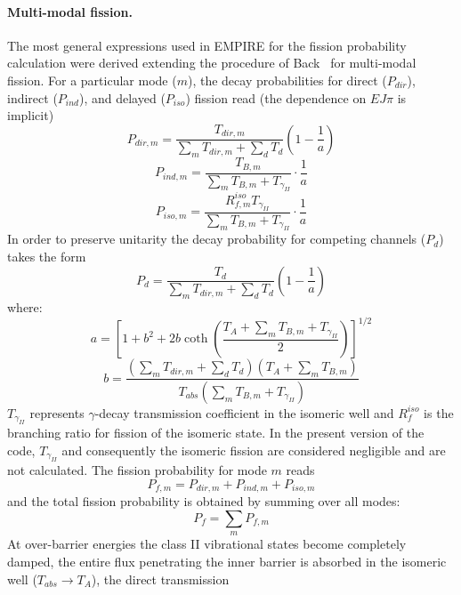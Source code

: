 \documentclass[twocolumn,amsmath,amssymb,10pt,groupedaddress,letter]{revtex4}
\begin{document}
\paragraph*{Multi-modal fission.}
The most general expressions used in EMPIRE for the fission probability
calculation were derived extending the procedure of Back~\cite{Back:74}
for multi-modal fission. For a particular mode ($m$), the decay probabilities
for direct ($P_{dir}$), indirect ($P_{ind}$), and delayed ($P_{iso}$)
fission read (the dependence on $EJ\pi$ is implicit)
\begin{equation}
P_{dir,m}=\frac{T_{dir,m}}{\sum_{m}T_{dir,m}+\sum_{d}T_{d}}\left(1-\frac{1}{a}\right)
\end{equation}
\begin{equation}
P_{ind,m}=\frac{T_{B,m}}{\sum_{m}T_{B,m}+T_{\gamma_{II}}}\cdot\frac{1}{a}
\end{equation}
\begin{equation}
P_{iso,m}=\frac{R_{f,m}^{iso}T_{\gamma_{II}}}{\sum_{m}T_{B,m}+T_{\gamma_{II}}}\cdot\frac{1}{a}
\end{equation}
 In order to preserve unitarity the decay probability for competing
channels ($P_{d}$) takes the form
\begin{equation}
P_{d}=\frac{T_{d}}{\sum_{m}T_{dir,m}+\sum_{d}T_{d}}\left(1-\frac{1}{a}\right)
\end{equation}
\noindent where: \[
a=\left[1+b^{2}+2b\coth\left(\frac{T_{A}+\sum_{m}T_{B,m}+T_{\gamma_{II}}}{2}\right)\right]^{1/2}\]
 \[
b=\frac{(\sum_{m}T_{dir,m}+\sum_{d}T_{d})(T_{A}+\sum_{m}T_{B,m})}{T_{abs}(\sum_{m}T_{B,m}+T_{\gamma_{II}})}\]
 $T_{\gamma_{II}}$ represents $\gamma$-decay transmission coefficient
in the isomeric well and $R_{f}^{iso}$ is the branching ratio for
fission of the isomeric state. In the present version of the code,
$T_{\gamma_{II}}$ and consequently the isomeric
fission are considered negligible and are not calculated. The fission
probability for mode $m$ reads
\begin{equation}
P_{f,m}=P_{dir,m}+P_{ind,m}+P_{iso,m}
\end{equation}
 and the total fission probability is obtained by summing over all
modes:
\begin{equation}
P_{f}=\sum_{m}P_{f,m}
\end{equation}
 At over-barrier energies the class II vibrational states become completely
damped, the entire flux penetrating the inner barrier is absorbed
in the isomeric well ($T_{abs}\rightarrow T_{A}$), the direct transmission
\end{document}
